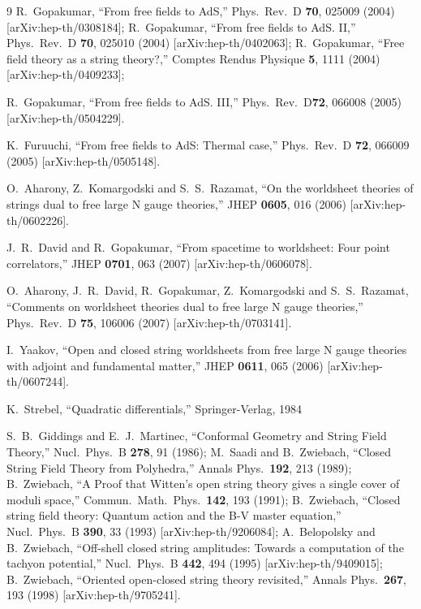 \documentclass[11pt]{JHEP3}
\begin{document}
\begin{thebibliography}{9}
R.~Gopakumar, ``From free fields to AdS,''
 Phys.\ Rev.\ D {\bf 70}, 025009 (2004) [arXiv:hep-th/0308184];
R.~Gopakumar, ``From free fields to AdS. II,''
 Phys.\ Rev.\ D {\bf
70}, 025010 (2004) [arXiv:hep-th/0402063];
R.~Gopakumar, ``Free field theory as a string theory?,'' Comptes
Rendus Physique {\bf 5}, 1111 (2004) [arXiv:hep-th/0409233];

R.~Gopakumar, ``From free fields to AdS. III,''
 Phys.\ Rev.\ D{\bf 72}, 066008 (2005) [arXiv:hep-th/0504229].

  K.~Furuuchi,
  ``From free fields to AdS: Thermal case,''
  Phys.\ Rev.\  D {\bf 72}, 066009 (2005)
  [arXiv:hep-th/0505148].

O.~Aharony, Z.~Komargodski and S.~S.~Razamat,
 ``On the worldsheet theories of strings dual to free large N gauge theories,''
  JHEP {\bf 0605}, 016 (2006) [arXiv:hep-th/0602226].

J.~R.~David and R.~Gopakumar, ``From spacetime to worldsheet: Four point correlators,''
JHEP {\bf 0701}, 063 (2007)
 [arXiv:hep-th/0606078].

O.~Aharony, J.~R.~David, R.~Gopakumar, Z.~Komargodski and S.~S.~Razamat,
  ``Comments on worldsheet theories dual to free large N gauge theories,''
  Phys.\ Rev.\  D {\bf 75}, 106006 (2007)
  [arXiv:hep-th/0703141].
  
  I.~Yaakov,
  ``Open and closed string worldsheets from free large N gauge theories with
  adjoint and fundamental matter,''
  JHEP {\bf 0611}, 065 (2006)
  [arXiv:hep-th/0607244].

 K.~Strebel, ``Quadratic differentials,'' Springer-Verlag, 1984


S.~B.~Giddings and E.~J.~Martinec,
  ``Conformal Geometry and String Field Theory,''
  Nucl.\ Phys.\  B {\bf 278}, 91 (1986);
 M.~Saadi and B.~Zwiebach,
  ``Closed String Field Theory from Polyhedra,''
  Annals Phys.\  {\bf 192}, 213 (1989);
  B.~Zwiebach,
  ``A Proof that Witten's open string theory gives a single cover of moduli
  space,''
  Commun.\ Math.\ Phys.\  {\bf 142}, 193 (1991);
 B.~Zwiebach,
  ``Closed string field theory: Quantum action and the B-V master equation,''
  Nucl.\ Phys.\  B {\bf 390}, 33 (1993)
  [arXiv:hep-th/9206084];
 A.~Belopolsky and B.~Zwiebach,
  ``Off-shell closed string amplitudes: Towards a computation of the tachyon
  potential,''
  Nucl.\ Phys.\  B {\bf 442}, 494 (1995)
  [arXiv:hep-th/9409015];
  B.~Zwiebach,
  ``Oriented open-closed string theory revisited,''
  Annals Phys.\  {\bf 267}, 193 (1998)
  [arXiv:hep-th/9705241].
 

\end{thebibliography}
\end{document}
